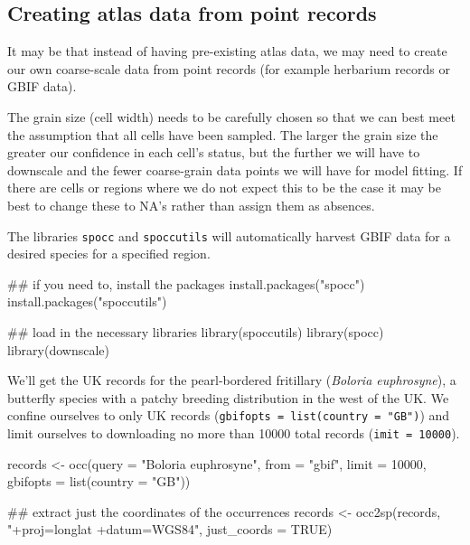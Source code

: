 \documentclass{article}[12pt, a4paper]
\begin{document}
\newpage
\subsection{Creating atlas data from point records}

It may be that instead of having pre-existing atlas data, we may need to create our own coarse-scale data from point records (for example herbarium records or GBIF data).

The grain size (cell width) needs to be carefully chosen so that we can best meet the assumption that all cells have been sampled. The larger the grain size the greater our confidence in each cell's status, but the further we will have to downscale and the fewer coarse-grain data points we will have for model fitting. If there are cells or regions where we do not expect this to be the case it may be best to change these to NA’s rather than assign them as absences.

The libraries \texttt{spocc} and \texttt{spoccutils} will automatically harvest GBIF data for a desired species for a specified region.

\begin{Schunk}
\begin{Sinput}
## if you need to, install the packages
install.packages("spocc")
install.packages("spoccutils")

## load in the necessary libraries
library(spoccutils)
library(spocc)
library(downscale)
\end{Sinput}
\end{Schunk}

We’ll get the UK records for the 
pearl-bordered fritillary (\emph{Boloria euphrosyne}), a butterfly species with a patchy breeding distribution in the west of the UK. We confine ourselves to only UK records (\texttt{gbifopts = list(country = "GB")}) and limit ourselves to downloading no more than 10000 total records (\texttt{imit = 10000}).

\begin{Schunk}
\begin{Sinput}
records <- occ(query = "Boloria euphrosyne",
               from = "gbif",
               limit = 10000,
               gbifopts = list(country = "GB"))
               
## extract just the coordinates of the occurrences
records <- occ2sp(records,
                  "+proj=longlat +datum=WGS84",
                  just_coords = TRUE)
\end{Sinput}
\end{Schunk}
\end{document}
